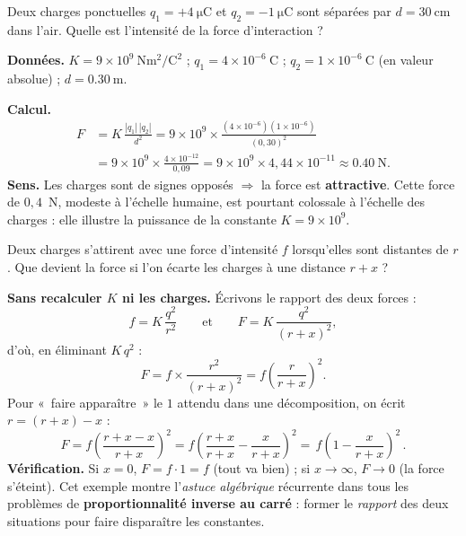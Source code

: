 \documentclass[11pt,a4paper]{article}
\begin{document}
\begin{exemple}
Deux charges ponctuelles $q_1 = +\SI{4}{\micro\coulomb}$ et $q_2 = -\SI{1}{\micro\coulomb}$ sont
séparées par $d = \SI{30}{\centi\metre}$ dans l'air. Quelle est l'intensité de la force
d'interaction ?

\textbf{Données.} $K = 9\times 10^{9}\ \si{\newton\metre\squared\per\coulomb\squared}$ ;
$q_1 = 4\times 10^{-6}\ \si{\coulomb}$ ; $q_2 = 1\times 10^{-6}\ \si{\coulomb}$ (en valeur
absolue) ; $d = \SI{0.30}{\metre}$.

\textbf{Calcul.}
\begin{align*}
F &= K\,\frac{|q_1|\,|q_2|}{d^{2}}
   = 9\times 10^{9}\times\frac{(4\times 10^{-6})(1\times 10^{-6})}{(0{,}30)^{2}} \\
  &= 9\times 10^{9}\times\frac{4\times 10^{-12}}{0{,}09}
   = 9\times 10^{9}\times 4{,}44\times 10^{-11}
   \approx \SI{0.40}{\newton}.
\end{align*}
\textbf{Sens.} Les charges sont de signes opposés $\Rightarrow$ la force est \textbf{attractive}.
Cette force de $0{,}4$~N, modeste à l'échelle humaine, est pourtant colossale à l'échelle des
charges : elle illustre la puissance de la constante $K = 9\times 10^{9}$.
\end{exemple}

\begin{exemple}
Deux charges s'attirent avec une force d'intensité $f$ lorsqu'elles sont distantes de $r$. Que
devient la force si l'on écarte les charges à une distance $r+x$ ?

\textbf{Sans recalculer $K$ ni les charges.} Écrivons le rapport des deux forces :
\[ f = K\,\frac{q^2}{r^{2}}\qquad\text{et}\qquad
   F = K\,\frac{q^2}{(r+x)^{2}}, \]
d'où, en éliminant $K\,q^2$ :
\[ F = f\times\frac{r^{2}}{(r+x)^{2}} = f\left(\frac{r}{r+x}\right)^{\!2}. \]
Pour «~faire apparaître~» le $1$ attendu dans une décomposition, on écrit
$r = (r+x) - x$ :
\[ F = f\left(\frac{r+x-x}{r+x}\right)^{\!2}
    = f\left(\frac{r+x}{r+x} - \frac{x}{r+x}\right)^{\!2}
    = \boxed{\,f\left(1 - \frac{x}{r+x}\right)^{\!2}\,}. \]
\textbf{Vérification.} Si $x=0$, $F=f\cdot 1 = f$ (tout va bien) ; si $x\to\infty$, $F\to 0$ (la
force s'éteint). Cet exemple montre l'\emph{astuce algébrique} récurrente dans tous les problèmes
de \textbf{proportionnalité inverse au carré} : former le \emph{rapport} des deux situations pour
faire disparaître les constantes.
\end{exemple}
\end{document}
